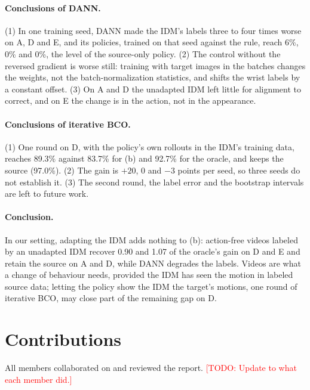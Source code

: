 \documentclass{article}
\newcommand{\todo}[1]{\textcolor{red}{[TODO: #1]}}
\begin{document}
\paragraph{Conclusions of DANN.}
(1) In one training seed, DANN made the IDM's labels three to four times worse on A, D and
E, and its policies, trained on that seed against the rule, reach 6\%, 0\% and 0\%, the
level of the source-only policy. (2) The control without the reversed gradient is worse
still: training with target images in the batches changes the weights, not the
batch-normalization statistics, and shifts the wrist labels by a constant offset. (3) On A and D the unadapted IDM left little for alignment to correct,
and on E the change is in the action, not in the appearance.

\paragraph{Conclusions of iterative BCO.}
(1) One round on D, with the policy's own rollouts in the IDM's training data, reaches
89.3\% against 83.7\% for (b) and 92.7\% for the oracle, and keeps the source (97.0\%).
(2) The gain is $+20$, 0 and $-3$ points per seed, so three seeds do not establish it.
(3) The second round, the label error and the bootstrap intervals are left to future work.

\paragraph{Conclusion.}
In our setting, adapting the IDM adds nothing to (b): action-free videos labeled by an
unadapted IDM recover 0.90 and 1.07 of the oracle's gain on D and E and retain the source
on A and D, while DANN degrades the labels. Videos are what a change of behaviour needs,
provided the IDM has seen the motion in labeled source data; letting the policy show the
IDM the target's motions, one round of iterative BCO, may close part of the remaining gap
on D.

\section*{Contributions}
All members collaborated on and reviewed the report.
\todo{Update to what each member did.}
\end{document}
